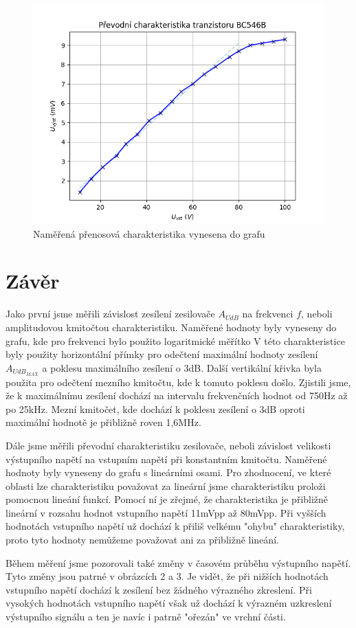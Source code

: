 \documentclass[a4paper, czech]{article}
\begin{document}
\begin{figure}[H]
    \centering
    \includegraphics{pch.png}
    \caption{Naměřená přenosová charakteristika vynesena do grafu}
\end{figure}

\section{Závěr}

Jako první jsme měřili závislost zesílení zesilovače $A_{UdB}$ na frekvenci $f$, neboli amplitudovou kmitočtou charakteristiku.
Naměřené hodnoty byly vyneseny do grafu, kde pro frekvenci bylo použito logaritmické měřítko
V této charakteristice byly použity horizontální přímky pro odečtení maximální hodnoty zesílení $A_{UdB_{MAX}}$ a poklesu maximálního zesílení o 3dB.
Další vertikální křivka byla použita pro odečtení mezního kmitočtu, kde k tomuto poklesu došlo.
Zjistili jsme, že k maximálnímu zesílení dochází na intervalu frekvenčních hodnot od 750Hz až po 25kHz.
Mezní kmitočet, kde dochází k poklesu zesílení o 3dB oproti maximální hodnotě je přibližně roven 1,6MHz.

Dále jsme měřili převodní charakteristiku zesilovače, neboli závislost velikosti výstupního napětí na vstupním napětí při konstantním kmitočtu.
Naměřené hodnoty byly vyneseny do grafu s lineárními osami.
Pro zhodnocení, ve které oblasti lze charakteristiku považovat za lineární jsme charakteristiku proloži pomocnou lineání funkcí.
Pomocí ní je zřejmé, že charakteristika je přibližně lineární v rozsahu hodnot vstupního napětí 11mVpp až 80mVpp.
Při vyšších hodnotách vstupního napětí už dochází k přiliš velkému "ohybu" charakteristiky, proto tyto hodnoty nemůžeme považovat ani za přibližně lineání.

Během měření jsme pozorovali také změny v časovém průběhu výstupního napětí.
Tyto změny jsou patrné v obrázcích 2 a 3.
Je vidět, že při nižších hodnotách vstupního napětí dochází k zesílení bez žádného výrazného zkreslení.
Při vysokých hodnotách vstupního napětí však už dochází k výrazném uzkreslení výstupního signálu a ten je navíc i patrně "ořezán" ve vrchní části.
\end{document}
